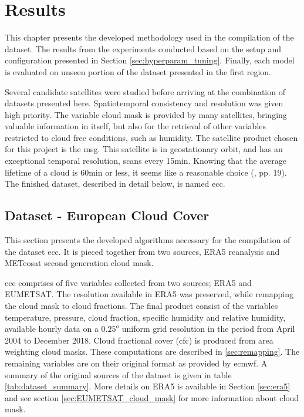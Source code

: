 \chapter{Results}
This chapter presents the developed methodology used in the compilation of the dataset. 
The results from the experiments conducted based on the setup and configuration presented in Section \ref{sec:hyperparam_tuning}. Finally, each model is evaluated on unseen portion of the dataset presented in the first region.

Several candidate satellites were studied before arriving at the combination of datasets presented here. Spatiotemporal consistency and resolution was given high priority. 
The variable cloud mask is provided by many satellites, bringing valuable information in itself, but also for the retrieval of other variables restricted to cloud free conditions, such as humidity. The satellite product chosen for this project is the \acrfull{msg}. This satellite is in geostationary orbit, and has an exceptional temporal resolution, scans every 15min. Knowing that the average lifetime of a cloud is 60min or less, it seems like a reasonable choice (\cite{lohmann2016}, pp. 19). The finished dataset, described in detail below, is named \acrfull{ecc}.

\section{Dataset - European Cloud Cover }
This section presents the developed algorithms necessary for the compilation of the dataset \acrfull{ecc}. It is pieced together from two sources, ERA5 reanalysis and METeosat second generation cloud mask. %

\acrshort{ecc} comprises of five variables collected from two sources; ERA5 and EUMETSAT. The resolution available in ERA5 was preserved, while remapping the cloud mask to cloud fractions. The final product consist of the variables temperature, pressure, cloud fraction, specific humidity and relative humidity, available hourly data on a $0.25^o$ uniform grid resolution in the period from April 2004 to December 2018. Cloud fractional cover (\acrshort{cfc}) is produced from area weighting cloud masks. These computations are described in \ref{sec:remapping}. The remaining variables are on their original format as provided by \acrfull{ecmwf}. A summary of the original sources of the dataset is given in table \ref{tab:dataset_summary}. More details on ERA5 is available in Section \ref{sec:era5} and see section \ref{sec:EUMETSAT_cloud_mask} for more information about cloud mask. 


